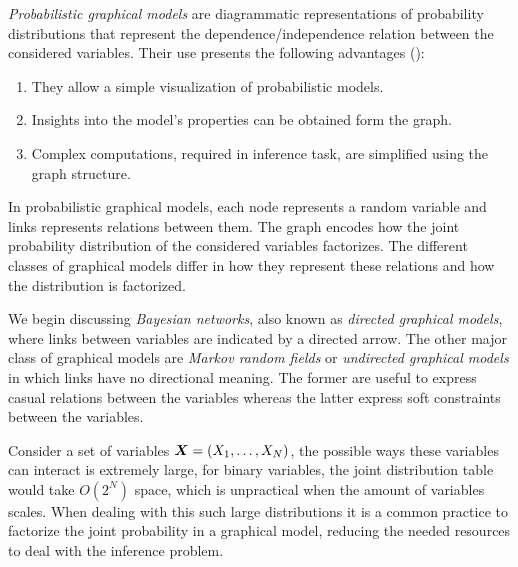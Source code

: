 
\emph{Probabilistic graphical models} are diagrammatic representations of probability distributions that represent the dependence/independence relation between the considered variables. Their use presents the following advantages (\cite{bishop2006pattern}):
\begin{enumerate}\setlength{\itemsep}{0.2cm}
  \item They allow a simple visualization of probabilistic models.
  \item Insights into the model's properties can be obtained form the graph.
  \item Complex computations, required in inference task, are simplified using the graph structure.
\end{enumerate}

In probabilistic graphical models, each node represents a random variable and links represents relations between them. The graph encodes how the joint probability distribution of the considered variables factorizes. The different classes of graphical models differ in how they represent these relations and how the distribution is factorized.

We begin discussing \emph{Bayesian networks}, also known as \emph{directed graphical models}, where links between variables are indicated by a directed arrow.  The other major class of graphical models are \emph{Markov random fields} or \emph{undirected graphical models} in which links have no directional meaning. The former are useful to express casual relations between the variables whereas the latter express soft constraints between the variables.

Consider a set of variables \(\bm{X} = (X_{1},\dots, X_{N})\), the possible ways these variables can interact is extremely large, for binary variables, the joint distribution table would take \(O(2^{N})\) space, which is unpractical when the amount of variables scales. When dealing with this such large distributions it is a common practice to factorize the joint probability in a graphical model, reducing the needed resources to deal with the inference problem.
